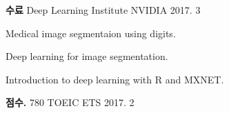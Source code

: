 \begin{cventries}
  \cventry
    {\textbf{수료}}
    {Deep Learning Institute}
    {NVIDIA}
    {2017. 3}
    {
      \begin{cvitems}
        \item {Medical image segmentaion using digits.}
        \item {Deep learning for image segmentation.}
        \item {Introduction to deep learning with R and MXNET.}
      \end{cvitems}
    }
  \cventry
    {\textbf{점수. } 780}
    {TOEIC}
    {ETS}
    {2017. 2}
    {}
\end{cventries}
